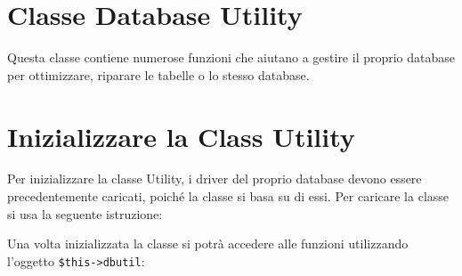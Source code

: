 \section*{Classe Database Utility}
Questa classe contiene numerose funzioni che aiutano a gestire il proprio database per ottimizzare, riparare le tabelle o lo stesso database.

\section*{Inizializzare la Class Utility}
Per inizializzare la classe Utility, i driver del proprio database devono essere precedentemente caricati, poiché la classe si basa su di essi. Per caricare la classe si usa la seguente istruzione:


Una volta inizializzata la classe si potrà accedere alle funzioni utilizzando l'oggetto \verb|$this->dbutil|:



